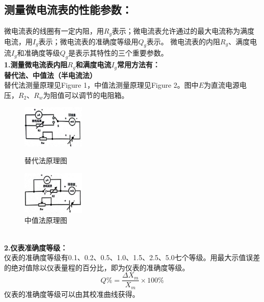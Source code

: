 \documentclass{article}
\begin{document}
\subsection{测量微电流表的性能参数：}
\hspace*{2em}微电流表的线圈有一定内阻，用$R_g$表示；微电流表允许通过的最大电流称为满度电流，用$I_g$表示；微电流表的准确度等级用$Q_g$表示。
微电流表的内阻$R_g$、满度电流$I_g$和准确度等级$Q_g$是表示其特性的三个重要参数。\\
\hspace*{2em}\textbf{1.测量微电流表内阻$R_g$和满度电流$I_g$常用方法有：}\\
\hspace*{2em}\textbf{替代法、中值法（半电流法）}\\
\hspace*{2em}替代法测量原理见Figure 1，中值法测量原理见Figure 2。图中$E$为直流电源电压，$R_2、R_w$为阻值可以调节的电阻箱。\\
\begin{figure}[ht]
    \centering
    \begin{minipage}{0.45\textwidth} %
        \centering
        \includegraphics[width=3cm]{1.1.png} %
        \caption{替代法原理图}
    \end{minipage}\hfill
    \begin{minipage}{0.45\textwidth}
        \centering
        \includegraphics[width=3cm]{1.2.png} %
        \caption{中值法原理图}
    \end{minipage}
\end{figure}
\\
\hspace*{2em}\textbf{2.仪表准确度等级：}\\
\hspace*{2em} 仪表的准确度等级有0.1、0.2、0.5、1.0、1.5、2.5、5.0七个等级。用最大示值误差的绝对值除以仪表量程的百分比，即为仪表的准确度等级。
$$
Q \% =\frac{\Delta X_m}{X_m}\times 100 \%
$$
\hspace*{2em} 仪表的准确度等级可以由其校准曲线获得。
\end{document}
